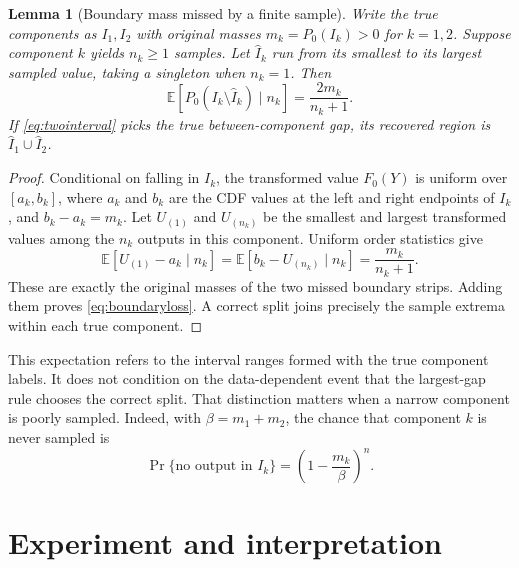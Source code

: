 \documentclass[10pt,letterpaper]{article}
\theoremstyle{typed}
\newtheorem{lemma}{Lemma}
\begin{document}
\begin{lemma}[Boundary mass missed by a finite sample]
Write the true components as $I_1,I_2$ with original masses $m_k=P_0(I_k)>0$ for $k=1,2$. Suppose component $k$ yields $n_k\geq1$ samples. Let $\widehat I_k$ run from its smallest to its largest sampled value, taking a singleton when $n_k=1$. Then
\begin{equation}
 \mathbb E\!\left[P_0(I_k\setminus\widehat I_k)\mid n_k\right]
 =\frac{2m_k}{n_k+1}.
 \label{eq:boundaryloss}
\end{equation}
If \eqref{eq:twointerval} picks the true between-component gap, its recovered region is $\widehat I_1\cup\widehat I_2$.
\end{lemma}
\begin{proof}
Conditional on falling in $I_k$, the transformed value $F_0(Y)$ is uniform over $[a_k,b_k]$, where $a_k$ and $b_k$ are the CDF values at the left and right endpoints of $I_k$, and $b_k-a_k=m_k$. Let $U_{(1)}$ and $U_{(n_k)}$ be the smallest and largest transformed values among the $n_k$ outputs in this component. Uniform order statistics give
\[
  \mathbb E[U_{(1)}-a_k\mid n_k]
  =\mathbb E[b_k-U_{(n_k)}\mid n_k]
  =\frac{m_k}{n_k+1}.
\]
These are exactly the original masses of the two missed boundary strips. Adding them proves \eqref{eq:boundaryloss}. A correct split joins precisely the sample extrema within each true component.
\end{proof}

This expectation refers to the interval ranges formed with the true component labels. It does not condition on the data-dependent event that the largest-gap rule chooses the correct split. That distinction matters when a narrow component is poorly sampled. Indeed, with $\beta=m_1+m_2$, the chance that component $k$ is never sampled is
\[
  \Pr\{\text{no output in }I_k\}
  =\left(1-\frac{m_k}{\beta}\right)^n.
\]

\section{Experiment and interpretation}
\end{document}

